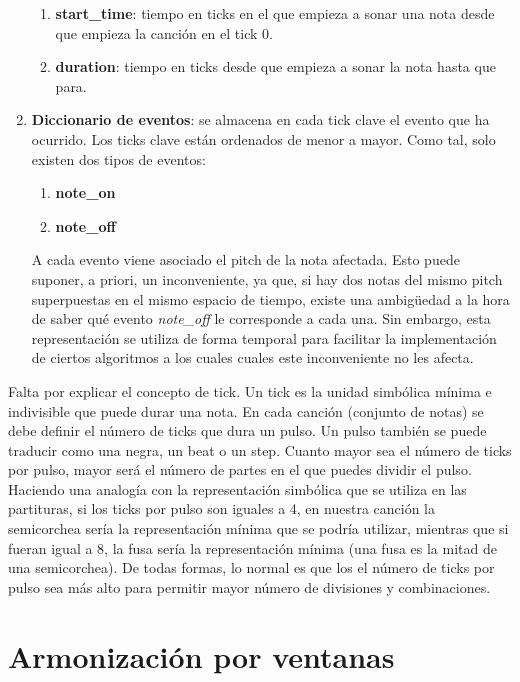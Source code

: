 \begin{enumerate}
\begin{enumerate}
        \item[\textbullet] \textbf{start\_time}: tiempo en ticks en el que empieza a sonar una nota desde que empieza la canción en el tick 0.
        \item[\textbullet] \textbf{duration}: tiempo en ticks desde que empieza a sonar la nota hasta que para.
    \end{enumerate}
    \item \textbf{Diccionario de eventos}: se almacena en cada tick clave el evento que ha ocurrido. Los ticks clave están ordenados de menor a mayor. Como tal, solo existen dos tipos de eventos: 
    \begin{enumerate}
        \item[\textbullet] \textbf{note\_on}
        \item[\textbullet] \textbf{note\_off}
    \end{enumerate}
    A cada evento viene asociado el pitch de la nota afectada. Esto puede suponer, a priori, un inconveniente, ya que, si hay dos notas del mismo pitch superpuestas en el mismo espacio de tiempo, existe una ambigüedad a la hora de saber qué evento \textit{note\_off} le corresponde a cada una. Sin embargo, esta representación se utiliza de forma temporal para facilitar la implementación de ciertos algoritmos a los cuales cuales este inconveniente no les afecta. 
    
\end{enumerate}

    Falta por explicar el concepto de tick. Un tick es la unidad simbólica mínima e indivisible que puede durar una nota. En cada canción (conjunto de notas) se debe definir el número de ticks que dura un pulso. Un pulso también se puede traducir como una negra, un beat o un step. Cuanto mayor sea el número de ticks por pulso, mayor será el número de partes en el que puedes dividir el pulso. Haciendo una analogía con la representación simbólica que se utiliza en las partituras, si los ticks por pulso son iguales a 4, en nuestra canción la semicorchea sería la representación mínima que se podría utilizar, mientras que si fueran igual a 8, la fusa sería la representación mínima (una fusa es la mitad de una semicorchea). De todas formas, lo normal es que los el número de ticks por pulso sea más alto para permitir mayor número de divisiones y combinaciones.

\section{Armonización por ventanas}\label{arm:sec:ventanas_normal}

